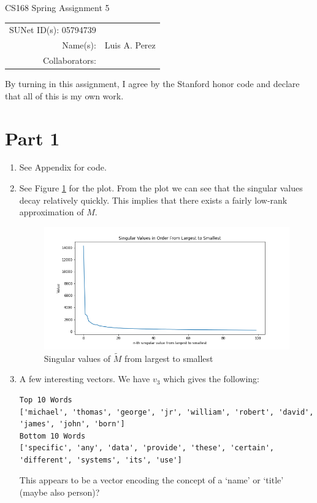 \documentclass[12pt]{article}
\begin{document}
\begin{center}
{\Large CS168 Spring Assignment 5}

\begin{tabular}{rl}
SUNet ID(s): 05794739 & \\
Name(s): & Luis A. Perez \\
Collaborators: &
\end{tabular}
\end{center}

By turning in this assignment, I agree by the Stanford honor code and declare
that all of this is my own work.

\section*{Part 1}

\begin{enumerate}[label=(\alph*)]
  \item See Appendix for code. 
  \item See Figure \ref{fig:singular_values} for the plot. From the plot we can see
    that the singular values decay relatively quickly. This implies that there exists a fairly low-rank approximation of $M$.

    \begin{figure}[!ht]
      \centering
      \includegraphics[scale=0.5]{figures/singular_values.png}
      \caption{Singular values of $\tilde{M}$ from largest to smallest}
      \label{fig:singular_values}
    \end{figure}
  \item
    A few interesting vectors. We have $v_3$ which gives the following:
    \begin{verbatim}
Top 10 Words
['michael', 'thomas', 'george', 'jr', 'william', 'robert', 'david', 'james', 'john', 'born']
Bottom 10 Words
['specific', 'any', 'data', 'provide', 'these', 'certain', 'different', 'systems', 'its', 'use']
    \end{verbatim}
    This appears to be a vector encoding the concept of a `name' or `title' (maybe also person)?


\end{enumerate}
\end{document}
